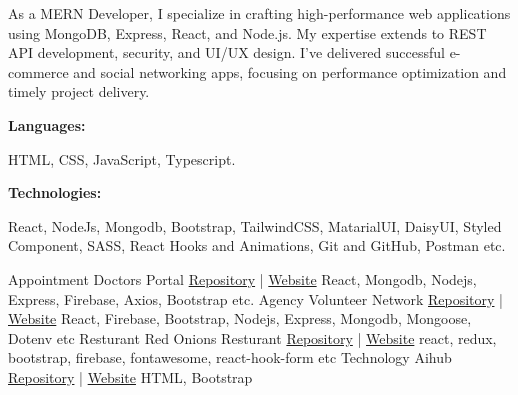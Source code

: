 \documentclass[9pt]{developercv} %
\begin{document}
\begin{minipage}[t]{0.46\textwidth}
	\vspace{-6pt}
 
	As a MERN Developer, I specialize in crafting high-performance web applications using MongoDB, Express, React, and Node.js. My expertise extends to REST API development, security, and UI/UX design. I've delivered successful e-commerce and social networking apps, focusing on performance optimization and timely project delivery. \\
\end{minipage}
\hfill %
\begin{minipage}[t]{0.465\textwidth}
    \vspace{-6pt}

    \begin{minipage}[t]{0.2\textwidth}
        \textbf{Languages:}
    \end{minipage}
    \hfill
    \begin{minipage}[t]{0.73\textwidth}
      {HTML, CSS, JavaScript, Typescript. }
    \end{minipage}
    \vspace{4mm}
    
    \begin{minipage}[t]{0.2\textwidth}
        \textbf{Technologies:}
    \end{minipage}
    \hfill
    \begin{minipage}[t]{0.73\textwidth}
      React, NodeJs, Mongodb, Bootstrap, TailwindCSS, MatarialUI, DaisyUI, Styled Component, SASS, React Hooks and Animations, Git and GitHub, Postman etc.
    \end{minipage}
    
\end{minipage}

\begin{entrylist}
    \entry
		{Appointment}
		{Doctors Portal}
		{\href{https://github.com/fs-nirjhor/doctors-portal-fsn}{Repository} | \href{https://doctors-portal-fsn.netlify.app}{Website}}
		{React, Mongodb, Nodejs, Express, Firebase, Axios, Bootstrap etc.}
    \entry
		{Agency}
		{Volunteer Network}
		{\href{https://github.com/fs-nirjhor/volunteer-network-fsn}{Repository} | \href{https://volunteer-network-fsn.netlify.app/}{Website}}
		{React, Firebase, Bootstrap, Nodejs, Express, Mongodb, Mongoose, Dotenv etc}
	\entry
		{Resturant}
		{Red Onions Resturant}
		{\href{https://github.com/fs-nirjhor/red-onion-resturants-fsn}{Repository} | \href{https://red-onion-resturants-fsn.netlify.app}{Website}}
		{react, redux, bootstrap, firebase, fontawesome, react-hook-form etc}
    \entry
		{Technology}
		{Aihub}
		{\href{https://github.com/fs-nirjhor/aihub-fsn}{Repository} | \href{https://aihub-fsn.netlify.app}{Website}}
		{HTML, Bootstrap}
\end{entrylist}
\end{document}
